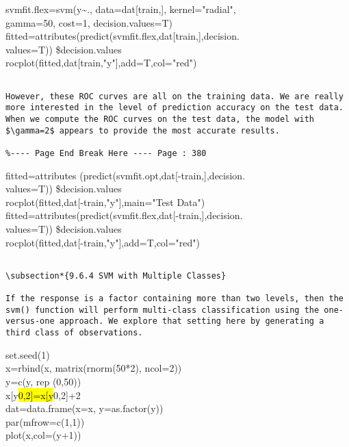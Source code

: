 \documentclass[10pt]{article}
\begin{document}
\begin{displayquote}
svmfit.flex=svm(y\~{}., data=dat[train,], kernel="radial",\\
gamma=50, cost=1, decision.values=T)\\[0pt]
fitted=attributes(predict(svmfit.flex,dat[train,],decision.\\
values=T)) \$decision.values\\[0pt]
rocplot(fitted,dat[train,"y"],add=T,col="red")
\end{displayquote}

\begin{verbatim}

However, these ROC curves are all on the training data. We are really more interested in the level of prediction accuracy on the test data. When we compute the ROC curves on the test data, the model with $\gamma=2$ appears to provide the most accurate results.

%---- Page End Break Here ---- Page : 380
\end{verbatim}

\begin{displayquote}
fitted=attributes (predict(svmfit.opt,dat[-train,],decision.\\
values=T)) \$decision.values\\[0pt]
rocplot(fitted,dat[-train,"y"],main="Test Data")\\[0pt]
fitted=attributes(predict(svmfit.flex,dat[-train,],decision.\\
values=T)) \$decision.values\\[0pt]
rocplot(fitted,dat[-train,"y"],add=T,col="red")
\end{displayquote}

\begin{verbatim}

\subsection*{9.6.4 SVM with Multiple Classes}

If the response is a factor containing more than two levels, then the svm() function will perform multi-class classification using the one-versus-one approach. We explore that setting here by generating a third class of observations.
\end{verbatim}

\begin{displayquote}
set.seed(1)\\
x=rbind(x, matrix(rnorm(50*2), ncol=2))\\
y=c(y, rep (0,50))\\
x[y\hl{0,2]=x[y}0,2]+2\\
dat=data.frame(x=x, y=as.factor(y))\\
par(mfrow=c(1,1))\\
plot(x,col=(y+1))
\end{displayquote}
\end{document}
